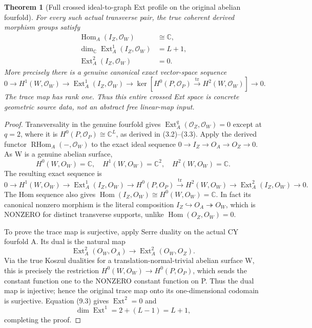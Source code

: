 \documentclass[11pt,a4paper]{article}
\newtheorem{theorem}{Theorem}[section]
\begin{document}
\begin{theorem}[Full crossed ideal-to-graph Ext profile on the original abelian fourfold]
For every such actual
transverse pair, the
true coherent derived
morphism groups satisfy
\[
 \boxed{
 \begin{aligned}
 \operatorname{Hom}_A(I_Z,\mathcal O_W)
                      &\cong\mathbb C,\\
 \dim_{\mathbb C}
 \operatorname{Ext}^1_A(I_Z,\mathcal O_W)&=L+1,\\
 \operatorname{Ext}^2_A(I_Z,\mathcal O_W)&=0.
 \end{aligned}}                                          \tag{9.1}
\]
More precisely there is a
genuine canonical exact
vector-space sequence
\[
 \boxed{
 0\longrightarrow H^1(W,\mathcal O_W)
 \longrightarrow\operatorname{Ext}^1_A
       (I_Z,\mathcal O_W)
 \longrightarrow
 \ker\left[
   H^0(P,\mathcal O_P)\xrightarrow{\mathrm{tr}}
      H^2(W,\mathcal O_W)\right]
 \longrightarrow0 .}                                    \tag{9.2}
\]
The trace map has rank one.
Thus this entire crossed
Ext space is concrete
geometric source data,
not an abstract free
linear-map input.
\end{theorem}
\begin{proof}
Transversality in the
genuine fourfold gives
\(
 \operatorname{Ext}^q_A
   (\mathcal O_Z,\mathcal O_W)=0
\)
except at \(q=2\),
where it is
\(H^0(P,\mathcal O_P)\cong\mathbb C^L\),
as derived in (3.2)--(3.3).
Apply the derived functor
\(\operatorname{RHom}_A
(-,\mathcal O_W)\)
to the exact ideal
sequence
\(
0\to I_Z\to O_A\to O_Z\to0
\).
As W is a genuine
abelian surface,
\[
 H^0(W,O_W)=\mathbb C,\quad
 H^1(W,O_W)=\mathbb C^2,\quad
 H^2(W,O_W)=\mathbb C .
\]
The resulting exact
sequence is
\[
 0\to H^1(W,O_W)
  \to\operatorname{Ext}^1_A(I_Z,O_W)
  \to H^0(P,O_P)
  \xrightarrow{\mathrm{tr}}H^2(W,O_W)
  \to\operatorname{Ext}^2_A(I_Z,O_W)\to0.
                                                               \tag{9.3}
\]
The Hom sequence also
gives
\(\operatorname{Hom}(I_Z,O_W)
 \cong H^0(W,O_W)=\mathbb C\).
In fact its canonical
nonzero morphism is
the literal composition
\(I_Z\hookrightarrow O_A
\twoheadrightarrow O_W\),
which is NONZERO for
distinct transverse
supports, unlike
\(\operatorname{Hom}(O_Z,O_W)=0\).

To prove the trace map
is surjective, apply
Serre duality on the
actual CY fourfold A.
Its dual is the natural
map
\[
 \operatorname{Ext}^2_A(O_W,O_A)
  \longrightarrow\operatorname{Ext}^2_A(O_W,O_Z).
\]
Via the true Koszul
dualities for a
translation-normal-trivial
abelian surface W,
this is precisely
the restriction
\(
H^0(W,O_W)\to H^0(P,O_P)
\),
which sends the
constant function one
to the NONZERO
constant function on P.
Thus the dual map is
injective; hence the
original trace map
onto its one-dimensional
codomain is surjective.
Equation (9.3) gives
\(\operatorname{Ext}^2=0\)
and
\[
 \dim\operatorname{Ext}^1
  =2+(L-1)=L+1,
\]
completing the proof.
\end{proof}
\end{document}
